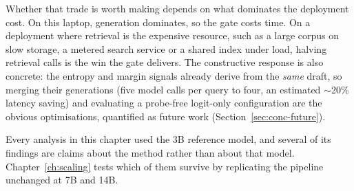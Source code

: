 Whether that trade is worth making depends on what dominates the deployment
cost. On this laptop, generation dominates, so the gate costs time. On a
deployment where retrieval is the expensive resource, such as a large corpus
on slow storage, a metered search service or a shared index under load, halving
retrieval calls is the win the gate delivers. The constructive response is
also concrete: the entropy and margin signals already derive from the
\emph{same} draft, so merging their generations (five model calls per query
to four, an estimated $\sim$20\% latency saving) and evaluating a probe-free
logit-only configuration are the obvious optimisations, quantified as future
work (Section~\ref{sec:conc-future}).

Every analysis in this chapter used the 3B reference model, and several of
its findings are claims about the method rather than about that model.
Chapter~\ref{ch:scaling} tests which of them survive by replicating the
pipeline unchanged at 7B and 14B.